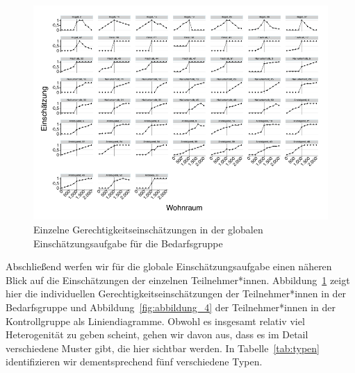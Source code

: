 \documentclass[justified,nobib,nohyper,symmetric,twoside]{tufte-book}
\begin{document}
\begin{figure}[t]\label{fig:abbildung_3}
   \center
   \includegraphics[width=0.99\linewidth]{figure_3.pdf}
   \caption{Einzelne Gerechtigkeitseinschätzungen in der globalen Einschätzungsaufgabe für die Bedarfsgruppe}
\end{figure}

Abschließend werfen wir für die globale Einschätzungsaufgabe ei\-nen näheren Blick auf die Einschätzungen der einzelnen Teilnehmer*\-innen.
Abbildung~\ref{fig:abbildung_3} zeigt hier die individuellen Gerechtigkeitseinschätzungen der Teilnehmer*innen in der Bedarfsgruppe und Abbildung~\ref{fig:abbildung_4} der Teilnehmer*innen in der Kontrollgruppe als Liniendiagramme.
Obwohl es insgesamt relativ viel Heterogenität zu geben scheint, gehen wir davon aus, dass es im Detail verschiedene Muster gibt, die hier sichtbar werden.
In Tabelle~\ref{tab:typen} identifizieren wir dementsprechend fünf verschiedene Typen.
\end{document}
